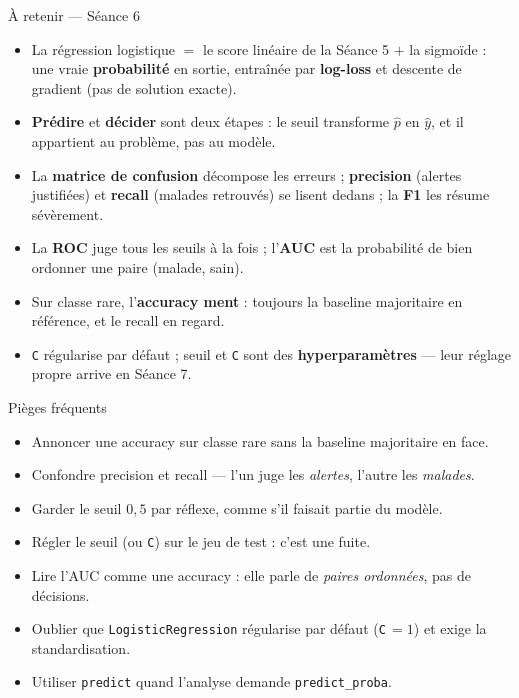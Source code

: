 \documentclass[aspectratio=169,11pt]{beamer}
\begin{document}
\begin{frame}{À retenir — Séance 6}
\begin{ucadret}[L'essentiel]
\begin{itemize}\small
  \item La régression logistique $= $ le score linéaire de la Séance 5 $+$ la sigmoïde : une vraie \textbf{probabilité} en sortie, entraînée par \textbf{log-loss} et descente de gradient (pas de solution exacte).
  \item \textbf{Prédire} et \textbf{décider} sont deux étapes : le seuil transforme $\hat p$ en $\hat y$, et il appartient au problème, pas au modèle.
  \item La \textbf{matrice de confusion} décompose les erreurs ; \textbf{precision} (alertes justifiées) et \textbf{recall} (malades retrouvés) se lisent dedans ; la \textbf{F1} les résume sévèrement.
  \item La \textbf{ROC} juge tous les seuils à la fois ; l'\textbf{AUC} est la probabilité de bien ordonner une paire (malade, sain).
  \item Sur classe rare, l'\textbf{accuracy ment} : toujours la baseline majoritaire en référence, et le recall en regard.
  \item \texttt{C} régularise par défaut ; seuil et \texttt{C} sont des \textbf{hyperparamètres} — leur réglage propre arrive en Séance 7.
\end{itemize}
\end{ucadret}
\end{frame}

\begin{frame}{Pièges fréquents}
\begin{itemize}\small
  \item Annoncer une accuracy sur classe rare sans la baseline majoritaire en face.
  \item Confondre precision et recall — l'un juge les \emph{alertes}, l'autre les \emph{malades}.
  \item Garder le seuil $0{,}5$ par réflexe, comme s'il faisait partie du modèle.
  \item Régler le seuil (ou \texttt{C}) sur le jeu de test : c'est une fuite.
  \item Lire l'AUC comme une accuracy : elle parle de \emph{paires ordonnées}, pas de décisions.
  \item Oublier que \texttt{LogisticRegression} régularise par défaut (\texttt{C}$\,=1$) et exige la standardisation.
  \item Utiliser \texttt{predict} quand l'analyse demande \texttt{predict\_proba}.
\end{itemize}
\end{frame}
\end{document}
